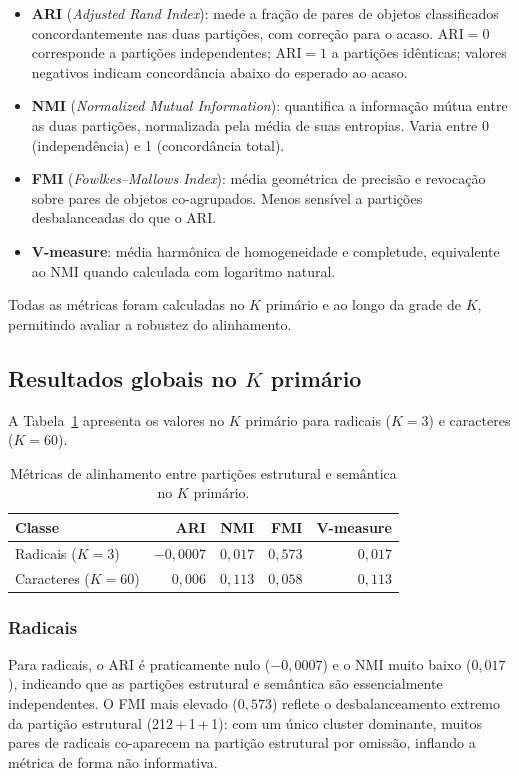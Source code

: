 \documentclass[10pt, a4paper, titlepage]{extarticle}
\begin{document}
\begin{itemize}
    \item \textbf{ARI} (\textit{Adjusted Rand Index}): mede a fração de pares de objetos classificados concordantemente nas duas partições, com correção para o acaso. $\text{ARI} = 0$ corresponde a partições independentes; $\text{ARI} = 1$ a partições idênticas; valores negativos indicam concordância abaixo do esperado ao acaso.
    \item \textbf{NMI} (\textit{Normalized Mutual Information}): quantifica a informação mútua entre as duas partições, normalizada pela média de suas entropias. Varia entre 0 (independência) e 1 (concordância total).
    \item \textbf{FMI} (\textit{Fowlkes--Mallows Index}): média geométrica de precisão e revocação sobre pares de objetos co-agrupados. Menos sensível a partições desbalanceadas do que o ARI.
    \item \textbf{V-measure}: média harmônica de homogeneidade e completude, equivalente ao NMI quando calculada com logaritmo natural.
\end{itemize}
Todas as métricas foram calculadas no $K$ primário e ao longo da grade de $K$, permitindo avaliar a robustez do alinhamento.

\subsection{Resultados globais no $K$ primário}
A Tabela~\ref{tab:metricas-kprimario} apresenta os valores no $K$ primário para radicais ($K = 3$) e caracteres ($K = 60$).

\begin{table}[H]
\centering
\renewcommand{\arraystretch}{1.2}
\begin{tabular}{lrrrr}
\toprule
\textbf{Classe} & \textbf{ARI} & \textbf{NMI} & \textbf{FMI} &
\textbf{V-measure} \\
\midrule
Radicais  ($K=3$)  & $-0{,}0007$ & $0{,}017$ & $0{,}573$ & $0{,}017$ \\
Caracteres ($K=60$) & $\phantom{-}0{,}006$ & $0{,}113$ & $0{,}058$ & $0{,}113$ \\
\bottomrule
\end{tabular}
\caption{Métricas de alinhamento entre partições estrutural e semântica no
$K$ primário.}
\label{tab:metricas-kprimario}
\end{table}

\subsubsection{Radicais}
Para radicais, o ARI é praticamente nulo ($-0{,}0007$) e o NMI muito
baixo ($0{,}017$), indicando que as partições estrutural e semântica são
essencialmente independentes. O FMI mais elevado ($0{,}573$)
reflete o desbalanceamento extremo da partição estrutural
(212\,+\,1\,+\,1): com um único cluster dominante, muitos pares de
radicais co-aparecem na partição estrutural por omissão, inflando a
métrica de forma não informativa.
\end{document}
